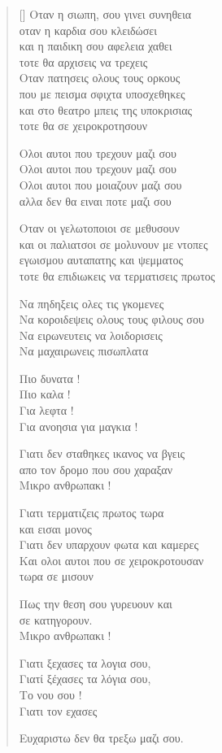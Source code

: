 \documentclass[12pt]{article}
\begin{document}
\settowidth{\versewidth}{και η παιδικη σου αφελεια χαθει}
\begin{verse}[\versewidth]
  Οταν η σιωπη, σου γινει συνηθεια \\
  οταν η καρδια σου κλειδώσει \\
  και η παιδικη σου αφελεια χαθει \\
  τοτε θα αρχισεις να τρεχεις \\

  Οταν πατησεις ολους τους ορκους \\
  που με πεισμα σφιχτα υποσχεθηκες \\
  και στο θεατρο μπεις της υποκρισιας \\
  τοτε θα σε χειροκροτησουν

  Ολοι αυτοι που τρεχουν μαζι σου \\
  Ολοι αυτοι που τρεχουν μαζι σου \\
  Ολοι αυτοι που μοιαζουν μαζι σου \\
  αλλα δεν θα ειναι ποτε μαζι σου

  Οταν οι γελωτοποιοι σε μεθυσουν \\
  και οι παλιατσοι σε μολυνουν με ντοπες \\
  εγωισμου αυταπατης και ψεμματος \\
  τοτε θα επιδιωκεις να τερματισεις πρωτος

  Να πηδηξεις ολες τις γκομενες \\
  Να κοροιδεψεις ολους τους φιλους σου \\
  Να ειρωνευτεις να λοιδορισεις \\
  Να μαχαιρωνεις πισωπλατα

  Πιο δυνατα ! \\
  Πιο καλα ! \\
  Για λεφτα ! \\
  Για ανοησια για μαγκια !

  Γιατι δεν σταθηκες ικανος να βγεις \\
  απο τον δρομο που σου χαραξαν \\
  Μικρο ανθρωπακι !

  Γιατι τερματιζεις πρωτος τωρα \\
  και εισαι μονος \\
  Γιατι δεν υπαρχουν φωτα και καμερες \\
  Και ολοι αυτοι που σε χειροκροτουσαν \\
  τωρα σε μισουν

  Πως την θεση σου γυρευουν και \\
  σε κατηγορουν. \\
  Μικρο ανθρωπακι !

  Γιατι ξεχασες τα λογια σου, \\
  Γιατί ξέχασες τα λόγια σου, \\
  Το νου σου ! \\
  Γιατι τον εχασες

  Ευχαριστω δεν θα τρεξω μαζι σου.
\end{verse}
\end{document}
